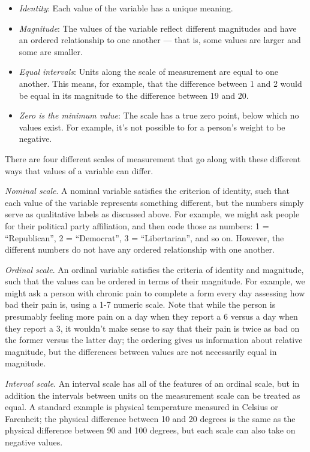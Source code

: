 \documentclass[]{book}
\providecommand{\tightlist}{%
  \setlength{\itemsep}{0pt}\setlength{\parskip}{0pt}}
\theoremstyle{definition}
\theoremstyle{definition}
\theoremstyle{definition}
\theoremstyle{remark}
\begin{document}
\begin{itemize}
\tightlist
\item
  \emph{Identity}: Each value of the variable has a unique meaning.\\
\item
  \emph{Magnitude}: The values of the variable reflect different
  magnitudes and have an ordered relationship to one another --- that
  is, some values are larger and some are smaller.
\item
  \emph{Equal intervals}: Units along the scale of measurement are equal
  to one another. This means, for example, that the difference between 1
  and 2 would be equal in its magnitude to the difference between 19 and
  20.
\item
  \emph{Zero is the minimum value}: The scale has a true zero point,
  below which no values exist. For example, it's not possible to for a
  person's weight to be negative.
\end{itemize}

There are four different scales of measurement that go along with these
different ways that values of a variable can differ.

\emph{Nominal scale}. A nominal variable satisfies the criterion of
identity, such that each value of the variable represents something
different, but the numbers simply serve as qualitative labels as
discussed above. For example, we might ask people for their political
party affiliation, and then code those as numbers: 1 = ``Republican'', 2
= ``Democrat'', 3 = ``Libertarian'', and so on. However, the different
numbers do not have any ordered relationship with one another.

\emph{Ordinal scale}. An ordinal variable satisfies the criteria of
identity and magnitude, such that the values can be ordered in terms of
their magnitude. For example, we might ask a person with chronic pain to
complete a form every day assessing how bad their pain is, using a 1-7
numeric scale. Note that while the person is presumably feeling more
pain on a day when they report a 6 versus a day when they report a 3, it
wouldn't make sense to say that their pain is twice as bad on the former
versus the latter day; the ordering gives us information about relative
magnitude, but the differences between values are not necessarily equal
in magnitude.

\emph{Interval scale}. An interval scale has all of the features of an
ordinal scale, but in addition the intervals between units on the
measurement scale can be treated as equal. A standard example is
physical temperature measured in Celsius or Farenheit; the physical
difference between 10 and 20 degrees is the same as the physical
difference between 90 and 100 degrees, but each scale can also take on
negative values.
\end{document}
